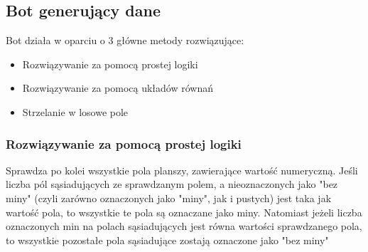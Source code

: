 \documentclass[letterpaper,12pt]{article}
\begin{document}
\subsection{Bot generujący dane}

Bot działa w oparciu o 3 główne metody rozwiązujące:
\begin{itemize}
    \item{Rozwiązywanie za pomocą prostej logiki}
    \item{Rozwiązywanie za pomocą układów równań}
    \item{Strzelanie w losowe pole}    
\end{itemize}
\subsubsection*{Rozwiązywanie za pomocą prostej logiki}
Sprawdza po kolei wszystkie pola planszy, zawierające wartość numeryczną. 
Jeśli liczba pól sąsiadujących ze sprawdzanym polem, a nieoznaczonych jako
"bez miny" (czyli zarówno oznaczonych jako "miny", jak i pustych) jest taka
jak wartość pola, to wszystkie te pola są oznaczane jako miny.
Natomiast jeżeli liczba oznaczonych min na polach sąsiadujących jest równa wartości 
sprawdzanego pola, to wszystkie pozostałe pola sąsiadujące zostają oznaczone jako "bez miny"
\end{document}
